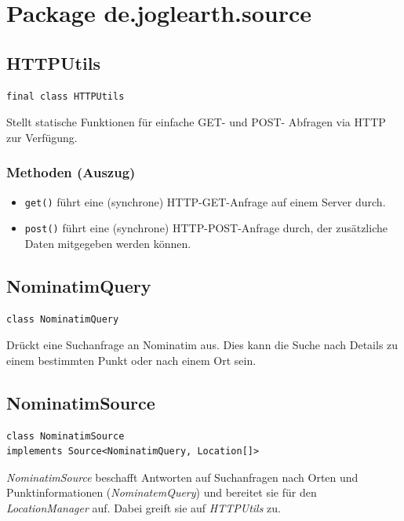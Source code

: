 \documentclass[10pt]{scrreprt}
\begin{document}
\pagebreak
\section{Package de.joglearth.source}
\subsection*{HTTPUtils}
\begin{lstlisting}
final class HTTPUtils
\end{lstlisting}
Stellt statische Funktionen für einfache GET- und POST- Abfragen via HTTP zur Verfügung.\\
\subsubsection*{Methoden (Auszug)}
\begin{itemize}
\item \texttt{get()} führt eine (synchrone) HTTP-GET-Anfrage auf einem Server durch.
\item \texttt{post()} führt eine (synchrone) HTTP-POST-Anfrage durch, der zusätzliche Daten mitgegeben werden können.
\end{itemize}

\vspace{5mm}
\subsection*{NominatimQuery}
\begin{lstlisting}
class NominatimQuery
\end{lstlisting}
Drückt eine Suchanfrage an Nominatim aus. Dies kann die Suche nach Details zu einem bestimmten Punkt oder nach einem Ort sein.\\

\vspace{5mm}
\subsection*{NominatimSource}
\begin{lstlisting}
class NominatimSource
implements Source<NominatimQuery, Location[]>
\end{lstlisting}
\textit{NominatimSource} beschafft Antworten auf Suchanfragen nach Orten und Punktinformationen (\textit{NominatemQuery}) und bereitet sie für den \textit{LocationManager} auf. Dabei greift sie auf \textit{HTTPUtils} zu.\\
\end{document}
